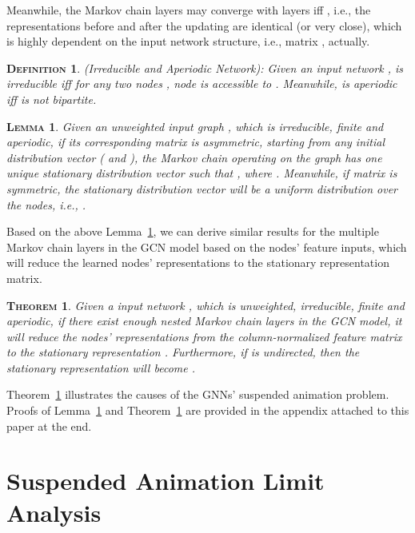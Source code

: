 \documentclass{article}
\newtheorem{definition}{\textsc{Definition}}
\newtheorem{theo}{\textsc{Theorem}}
\newtheorem{lemma}{\textsc{Lemma}}
\newcommand{\gcn}{\textsc{GCN}}
\begin{document}
Meanwhile, the Markov chain layers may converge with  layers iff , i.e., the representations before and after the updating are identical (or very close), which is highly dependent on the input network structure, i.e., matrix , actually.

\begin{definition}
(Irreducible and Aperiodic Network): Given an input network ,  is \textit{irreducible} iff for any two nodes , node  is accessible to . Meanwhile,  is \textit{aperiodic} iff  is not bipartite.
\end{definition}

\begin{lemma}\label{lemma:random_walk}
Given an unweighted input graph , which is \textit{irreducible}, \textit{finite} and \textit{aperiodic}, if its corresponding matrix is asymmetric, starting from any initial distribution vector  ( and ), the Markov chain operating on the graph has one unique stationary distribution vector  such that , where . Meanwhile, if matrix  is symmetric, the stationary distribution vector  will be a uniform distribution over the nodes, i.e., .
\end{lemma}

Based on the above Lemma~\ref{lemma:random_walk}, we can derive similar results for the multiple Markov chain layers in the {\gcn} model based on the nodes' feature inputs, which will reduce the learned nodes' representations to the stationary representation matrix.

\begin{theo}\label{theo:convergence}
Given a input network , which is \textit{unweighted}, \textit{irreducible}, \textit{finite} and \textit{aperiodic}, if there exist enough nested Markov chain layers in the {\gcn} model, it will reduce the nodes' representations from the column-normalized feature matrix  to the stationary representation . Furthermore, if  is undirected, then the stationary representation will become .
\end{theo}

Theorem~\ref{theo:convergence} illustrates the causes of the GNNs' suspended animation problem. Proofs of Lemma~\ref{lemma:random_walk} and Theorem~\ref{theo:convergence} are provided in the appendix attached to this paper at the end.

\vspace{-8pt}
\section{Suspended Animation Limit Analysis}\label{sec:limited_analysis}
\vspace{-8pt}
\end{document}
